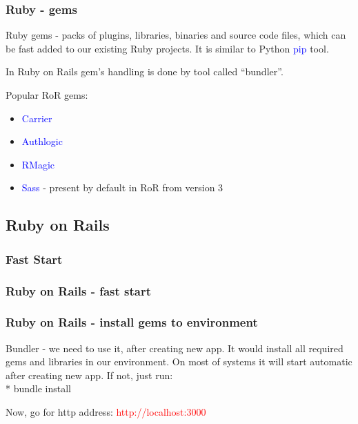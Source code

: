 \documentclass{beamer}
\theoremstyle{mystyle}
\begin{document}
\begin{frame}
  \frametitle{Ruby - gems}
  \begin{definition}
    Ruby gems - packs of plugins, libraries, binaries and source code files,
    which can be fast added to our existing Ruby projects. It is similar to
    Python \textcolor{blue}{pip} tool.
  \end{definition}
  
  \begin{definition}
    In Ruby on Rails gem's handling is done by tool called ``bundler''.
  \end{definition}
  
  \begin{example}
    Popular RoR gems:
    \begin{itemize}
    \item \textcolor{blue}{Carrier}
    \item \textcolor{blue}{Authlogic}
    \item \textcolor{blue}{RMagic}
    \item \textcolor{blue}{Sass} - present by default in RoR from version 3
    \end{itemize}
  \end{example}
\end{frame} 

\subsection{Ruby on Rails}

\subsubsection{Fast Start}
\begin{frame}
  \frametitle{Ruby on Rails - fast start}
  \newappGI
  \newappGII
\end{frame}

\begin{frame}
  \frametitle{Ruby on Rails - install gems to environment}
  \begin{definition}
    Bundler - we need to use it, after creating new app. It would install all
    required gems and libraries in our environment. On most of systems it will
    start automatic after creating new app. If not, just run:\\*
    bundle install
  \end{definition}
  Now, go for http address:
  \textcolor{red}{http://localhost:3000}
\end{frame}
\end{document}
